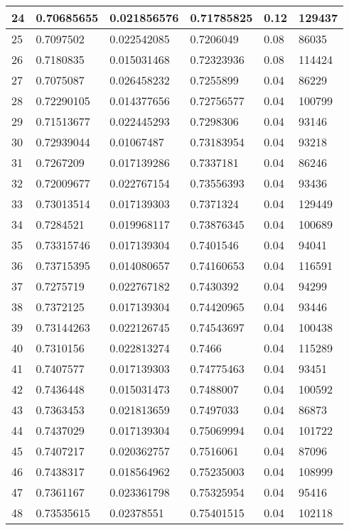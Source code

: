\begin{longtable}{|l|l|l|l|l|l|}
24 & 0.70685655 & 0.021856576 & 0.71785825 & 0.12 & 129437 \\ \hline 
25 & 0.7097502 & 0.022542085 & 0.7206049 & 0.08 & 86035 \\ \hline 
26 & 0.7180835 & 0.015031468 & 0.72323936 & 0.08 & 114424 \\ \hline 
27 & 0.7075087 & 0.026458232 & 0.7255899 & 0.04 & 86229 \\ \hline 
28 & 0.72290105 & 0.014377656 & 0.72756577 & 0.04 & 100799 \\ \hline 
29 & 0.71513677 & 0.022445293 & 0.7298306 & 0.04 & 93146 \\ \hline 
30 & 0.72939044 & 0.01067487 & 0.73183954 & 0.04 & 93218 \\ \hline 
31 & 0.7267209 & 0.017139286 & 0.7337181 & 0.04 & 86246 \\ \hline 
32 & 0.72009677 & 0.022767154 & 0.73556393 & 0.04 & 93436 \\ \hline 
33 & 0.73013514 & 0.017139303 & 0.7371324 & 0.04 & 129449 \\ \hline 
34 & 0.7284521 & 0.019968117 & 0.73876345 & 0.04 & 100689 \\ \hline 
35 & 0.73315746 & 0.017139304 & 0.7401546 & 0.04 & 94041 \\ \hline 
36 & 0.73715395 & 0.014080657 & 0.74160653 & 0.04 & 116591 \\ \hline 
37 & 0.7275719 & 0.022767182 & 0.7430392 & 0.04 & 94299 \\ \hline 
38 & 0.7372125 & 0.017139304 & 0.74420965 & 0.04 & 93446 \\ \hline 
39 & 0.73144263 & 0.022126745 & 0.74543697 & 0.04 & 100438 \\ \hline 
40 & 0.7310156 & 0.022813274 & 0.7466 & 0.04 & 115289 \\ \hline 
41 & 0.7407577 & 0.017139303 & 0.74775463 & 0.04 & 93451 \\ \hline 
42 & 0.7436448 & 0.015031473 & 0.7488007 & 0.04 & 100592 \\ \hline 
43 & 0.7363453 & 0.021813659 & 0.7497033 & 0.04 & 86873 \\ \hline 
44 & 0.7437029 & 0.017139304 & 0.75069994 & 0.04 & 101722 \\ \hline 
45 & 0.7407217 & 0.020362757 & 0.7516061 & 0.04 & 87096 \\ \hline 
46 & 0.7438317 & 0.018564962 & 0.75235003 & 0.04 & 108999 \\ \hline 
47 & 0.7361167 & 0.023361798 & 0.75325954 & 0.04 & 95416 \\ \hline 
48 & 0.73535615 & 0.02378551 & 0.75401515 & 0.04 & 102118 \\ \hline 

\end{longtable}
